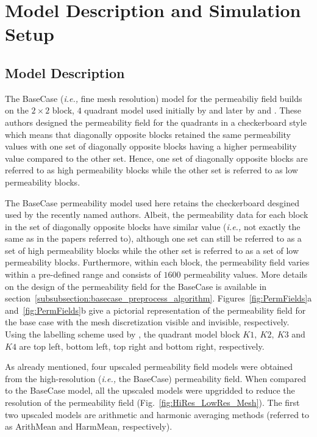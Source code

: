 \documentclass[preprint,12pt]{elsarticle}
\newcommand{\ie}{{\it i.e., }}
\begin{document}
\section{Model Description and Simulation Setup}\label{section:model_simulation}

\subsection{Model Description}\label{subsection:model}
The BaseCase  (\ie fine mesh resolution) model for the permeabiliy field builds on the $2 \times 2$ block, $4$ quadrant model used initially by \citet{Cardwell_1945} and later by \citet{Yeo2001} and \citet{dawe_2008}. These authors designed the permeability field for the quadrants in a checkerboard style which means that diagonally opposite blocks retained the same permeability values with one set of diagonally opposite blocks having a higher permeability value compared to the other set. Hence, one set of diagonally opposite blocks are referred to as high permeability blocks while the other set is referred to as low permeability blocks.

The BaseCase permeability model used here retains the checkerboard desgined used by the recently named authors. Albeit, the permeability data for each block in the set of diagonally opposite blocks have similar value (\ie not exactly the same as in the papers referred to), although one set can still be referred to as a set of high permeability blocks while the other set is referred to as a set of low permeability blocks. Furthermore, within each block, the permeability field varies within a pre-defined range and consists of $1600$ permeability values. More details on the design of the permeability field for the BaseCase is available in section~\ref{subsubsection:basecase_preprocess_algorithm}. Figures~\ref{fig:PermFields}a and~\ref{fig:PermFields}b give a pictorial representation of the permeability field for the base case with the mesh discretization visible and invisible, respectively.  Using the labelling scheme used by \citet{dawe_2008}, the quadrant model block $K1,~K2,~K3$ and $K4$ are top left, bottom left, top right and bottom right, respectively.

As already mentioned, four upscaled permeability field models were obtained from the high-resolution (\ie the BaseCase) permeability field. When compared to the BaseCase model, all the upscaled models were upgridded to reduce the resolution of the permeability field (Fig.~\ref{fig:HiRes_LowRes_Mesh}). The first two upscaled models are arithmetic and harmonic averaging methods  (referred to as ArithMean and HarmMean, respectively).
\end{document}
